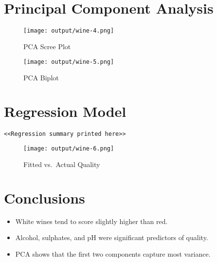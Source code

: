 \documentclass[11pt,a4paper]{article}
\begin{document}
\section{Principal Component Analysis}
\begin{figure}[h]
  \centering
  \texttt{[image: output/wine-4.png]}
  \caption{PCA Scree Plot}
\end{figure}

\begin{figure}[h]
  \centering
  \texttt{[image: output/wine-5.png]}
  \caption{PCA Biplot}
\end{figure}

\section{Regression Model}
\begin{verbatim}
<<Regression summary printed here>>
\end{verbatim}

\begin{figure}[h]
  \centering
  \texttt{[image: output/wine-6.png]}
  \caption{Fitted vs.\ Actual Quality}
\end{figure}

\section*{Conclusions}
\begin{itemize}
  \item White wines tend to score slightly higher than red.  
  \item Alcohol, sulphates, and pH were significant predictors of quality.  
  \item PCA shows that the first two components capture most variance.  
\end{itemize}
\end{document}
